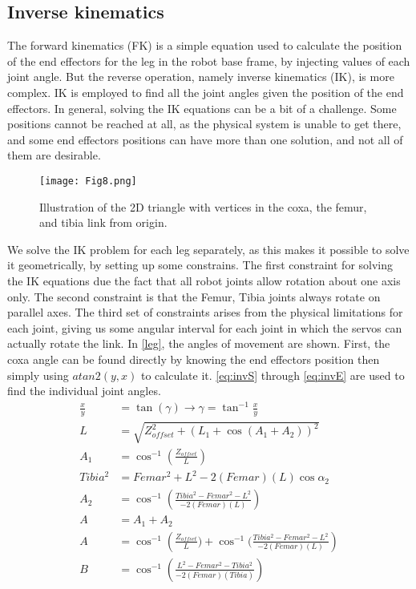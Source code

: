 \subsection{Inverse kinematics}
The forward kinematics (FK) is a simple equation used to calculate the position of the end effectors for the leg in the robot base frame, by injecting values of each joint angle. But the reverse operation, namely inverse kinematics (IK), is more complex. IK is employed to find all the joint angles given the position of the end effectors. In general, solving the IK equations can be a bit of a challenge. Some positions cannot be reached at all, as the physical system is unable to get there, and some end effectors positions can have more than one solution, and not all of them are desirable.
\begin{figure}[h]
    \centering
    \texttt{[image: Fig8.png]}
    \caption{ Illustration of the 2D triangle with vertices in the coxa, the femur, and tibia link from origin.}
    \label{fig8}
\end{figure}
We solve the IK problem for each leg separately, as this makes it possible to solve it geometrically, by setting up some constrains. The first constraint for solving the IK equations due the fact that all robot joints allow rotation about one axis only. The second constraint is that the Femur, Tibia joints always rotate on parallel axes. The third set of constraints arises from the physical limitations for each joint, giving us some angular interval for each joint in which the servos can actually rotate the link. In \ref{leg}, the angles of movement are shown.
First, the coxa angle can be found directly by knowing the end effectors position then simply using $atan2(y,x)$ to calculate it.  \ref{eq:invS} through \ref{eq:invE} are used to find the individual joint angles.
\begin{align}
    \frac{x}{y} & =\tan (\gamma)\to \gamma =\tan ^{-1}\frac{x}{y} \label{eq:invS}\\
    L              & = \sqrt{Z_{offset}^{2}+(L_{1}+\cos (A_1 + A_2))^{2}}\\
    A_{1}        & = \cos ^{-1}(\frac{Z_{offset}}{L})\\
    Tibia^{2}  & =Femar^{2}+L^{2}-2(Femar)(L)\cos \alpha _{2} \\
    A_{2} & =\cos^{-1}(\frac{Tibia^{2}-Femar^{2}-L^{2}}{-2(Femar)(L)}) \\
    A & =A_{1} + A_{2}\\
    A & = \cos ^{-1}\left(\frac{Z_{offset}}{L})+\cos ^{-1}(\frac{Tibia^{2}-Femar^{2}-L^{2}}{-2(Femar)(L)}\right) \\
    B & = \cos^{-1}\left(\frac{L^{2}-Femar^{2}-Tibia^{2}}{-2(Femar)(Tibia)}\right) \label{eq:invE}
\end{align}